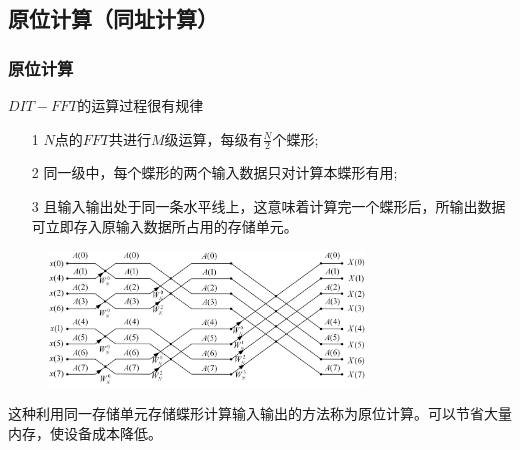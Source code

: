 \documentclass[notheorems,compress,mathserif,table]{beamer}
\begin{document}
\subsection{原位计算（同址计算）}
\begin{frame}[shrink]\frametitle{原位计算}

$DIT-FFT$的运算过程很有规律
\begin{itemize}
  \item [1] $N$点的$FFT$共进行$M$级运算，每级有$\frac{N}{2}$个蝶形;
  \item [2] 同一级中，每个蝶形的两个输入数据只对计算本蝶形有用;
  \item [3] 且输入输出处于同一条水平线上，这意味着计算完一个蝶形后，所输出数据可立即存入原输入数据所占用的存储单元。
\end{itemize}
\begin{figure}[h]
  \centering
  \includegraphics[width=0.75\textwidth]{8dftThird.jpg}
\end{figure}
这种利用同一存储单元存储蝶形计算输入输出的方法称为原位计算。可以节省大量内存，使设备成本降低。
\end{frame}
%
%
%
\end{document}

